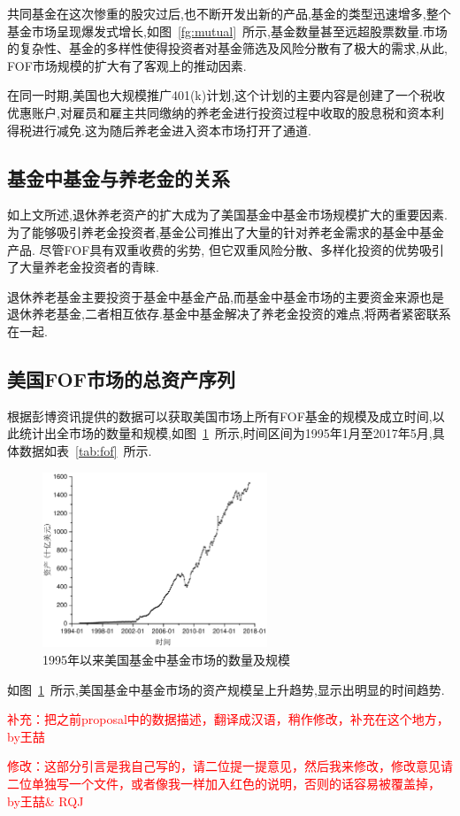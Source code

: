 共同基金在这次惨重的股灾过后,也不断开发出新的产品,基金的类型迅速增多,整个基金市场呈现爆发式增长,如图~\ref{fg:mutual}~所示,基金数量甚至远超股票数量.市场的复杂性、基金的多样性使得投资者对基金筛选及风险分散有了极大的需求,从此, FOF市场规模的扩大有了客观上的推动因素.

在同一时期,美国也大规模推广401(k)计划,这个计划的主要内容是创建了一个税收优惠账户,对雇员和雇主共同缴纳的养老金进行投资过程中收取的股息税和资本利得税进行减免.这为随后养老金进入资本市场打开了通道.

\subsection{基金中基金与养老金的关系\label{sec:retire}}

如上文所述,退休养老资产的扩大成为了美国基金中基金市场规模扩大的重要因素.为了能够吸引养老金投资者,基金公司推出了大量的针对养老金需求的基金中基金产品. 尽管FOF具有双重收费的劣势, 但它双重风险分散、多样化投资的优势吸引了大量养老金投资者的青睐.

退休养老基金主要投资于基金中基金产品,而基金中基金市场的主要资金来源也是退休养老基金,二者相互依存.基金中基金解决了养老金投资的难点,将两者紧密联系在一起.

\subsection{美国FOF市场的总资产序列}
根据彭博资讯提供的数据可以获取美国市场上所有FOF基金的规模及成立时间,以此统计出全市场的数量和规模,如图~\ref{fg:fof}~所示,时间区间为1995年1月至2017年5月,具体数据如表~\ref{tab:fof}~所示.
\begin{figure}[ht]
  \centering
  \includegraphics[width=0.6\textwidth]{pic/fof.pdf}
  \caption{1995年以来美国基金中基金市场的数量及规模}\label{fg:fof}
\end{figure}

如图~\ref{fg:fof}~所示,美国基金中基金市场的资产规模呈上升趋势,显示出明显的时间趋势.

\textcolor{red}{补充：把之前proposal中的数据描述，翻译成汉语，稍作修改，补充在这个地方，by王喆}

\textcolor{red}{修改：这部分引言是我自己写的，请二位提一提意见，然后我来修改，修改意见请二位单独写一个文件，或者像我一样加入红色的说明，否则的话容易被覆盖掉，by王喆\& RQJ}
